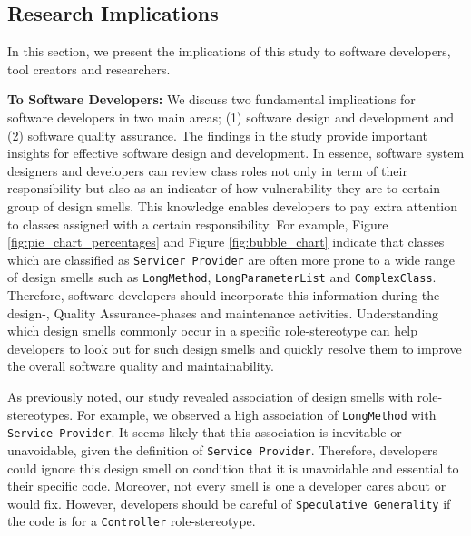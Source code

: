 \documentclass[AMA,Times1COL]{WileyNJDv5} %
\begin{document}
	
	\subsection{Research Implications}\label{implications}
	In this section, we present the implications of this study to software developers, tool creators and researchers.
	
	\textbf{To Software Developers:}
	We discuss two fundamental implications for software developers in two main areas; (1) software design and development and (2) software quality assurance.
	The findings in the study provide important insights for effective software design and development. In essence, software system designers and developers can review class roles not only in term of their responsibility but also as an indicator of how vulnerability they are to certain group of design smells. This knowledge enables developers to pay extra attention to classes assigned with a certain responsibility. For example, Figure \ref{fig:pie_chart_percentages} and Figure \ref{fig:bubble_chart} indicate that classes which are classified as \texttt{Servicer Provider} are often more prone to a wide range of design smells such as \texttt{LongMethod}, \texttt{LongParameterList} and \texttt{ComplexClass}. Therefore, software developers should incorporate this information during the design-, Quality Assurance-phases and maintenance activities. Understanding which design smells commonly occur in a specific role-stereotype can help developers to look out for such design smells and quickly resolve them to improve the overall software quality and maintainability.
	
	As previously noted, our study revealed association of design smells with role-stereotypes. For example, we observed a high association of \texttt{LongMethod} with \texttt{Service Provider}. It seems likely that this association is inevitable or unavoidable, given the definition of \texttt{Service Provider}. Therefore, developers could ignore this design smell on condition that it is unavoidable and essential to their specific code. Moreover, not every smell is one a developer cares about or would fix. However, developers should be careful of \texttt{Speculative Generality} if the code is for a \texttt{Controller} role-stereotype.
	
\end{document}
